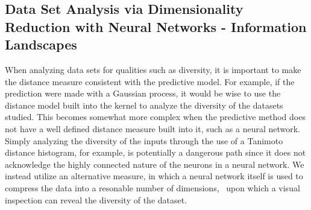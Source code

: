 \subsection{Data Set Analysis via Dimensionality Reduction with Neural Networks - Information Landscapes}
When analyzing data sets for qualities such as diversity, it is important to make the distance measure consistent with the predictive model.  For example, if the prediction were made with a Gaussian process, it would be wise to use the distance model built into the kernel to analyze the diversity of the datasets studied.  This becomes somewhat more complex when the predictive method does not have a well defined distance measure built into it, such as a neural network.  Simply analyzing the diversity of the inputs through the use of a Tanimoto distance histogram, for example, is potentially a dangerous path since it does not acknowledge the highly connected nature of the neurons in a neural network.  We instead utilize an alternative measure, in which a neural network itself is used to compress the data into a resonable number of dimensions,~\cite{hinton_reducing_2006} upon which a visual inspection can reveal the diversity of the dataset.

